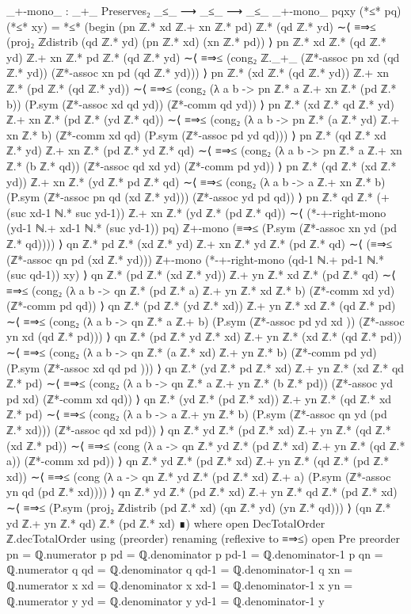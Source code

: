 \documentclass[11pt,a4paper]{article}
\begin{document}
\begin{code}
_+-mono_ :  _+_ Preserves₂ _≤_ ⟶ _≤_ ⟶ _≤_
_+-mono_ {p}{q}{x}{y} (*≤* pq) (*≤* xy) = *≤* (begin
  (pn ℤ.* xd ℤ.+ xn ℤ.* pd) ℤ.* (qd ℤ.* yd)
  ∼⟨ ≡⇒≤ (proj₂ ℤdistrib (qd ℤ.* yd) (pn ℤ.* xd) (xn ℤ.* pd))   ⟩
  pn ℤ.* xd ℤ.* (qd ℤ.* yd) ℤ.+ xn ℤ.* pd ℤ.* (qd ℤ.* yd) 
  ∼⟨ ≡⇒≤ (cong₂ ℤ._+_ (ℤ*-assoc pn xd (qd ℤ.* yd))
    (ℤ*-assoc xn pd (qd ℤ.* yd))) ⟩
  pn ℤ.* (xd ℤ.* (qd ℤ.* yd)) ℤ.+ xn ℤ.* (pd ℤ.* (qd ℤ.* yd)) 
  ∼⟨ ≡⇒≤ (cong₂ (λ a b -> pn ℤ.* a ℤ.+ xn ℤ.* (pd ℤ.* b)) 
    (P.sym (ℤ*-assoc xd qd yd)) (ℤ*-comm qd yd)) ⟩
  pn ℤ.* (xd ℤ.* qd ℤ.* yd) ℤ.+ xn ℤ.* (pd ℤ.* (yd ℤ.* qd)) 
  ∼⟨ ≡⇒≤ (cong₂ (λ a b -> pn ℤ.* (a ℤ.* yd) ℤ.+ xn ℤ.* b) 
    (ℤ*-comm xd qd) (P.sym (ℤ*-assoc pd yd qd))) ⟩
  pn ℤ.* (qd ℤ.* xd ℤ.* yd) ℤ.+ xn ℤ.* (pd ℤ.* yd ℤ.* qd) 
  ∼⟨ ≡⇒≤ (cong₂ (λ a b -> pn ℤ.* a ℤ.+ xn ℤ.* (b ℤ.* qd)) 
    (ℤ*-assoc qd xd yd) (ℤ*-comm pd yd)) ⟩
  pn ℤ.* (qd ℤ.* (xd ℤ.* yd)) ℤ.+ xn ℤ.* (yd ℤ.* pd ℤ.* qd) 
  ∼⟨ ≡⇒≤ (cong₂ (λ a b -> a ℤ.+ xn ℤ.* b) 
    (P.sym (ℤ*-assoc pn qd (xd ℤ.* yd))) (ℤ*-assoc yd pd qd)) ⟩
  pn ℤ.* qd ℤ.* (+ (suc xd-1 ℕ.* suc yd-1)) ℤ.+ xn ℤ.*
    (yd ℤ.* (pd ℤ.* qd))
  ∼⟨ (*-+-right-mono (yd-1 ℕ.+ xd-1 ℕ.* (suc yd-1)) pq)
    ℤ+-mono
    (≡⇒≤ (P.sym (ℤ*-assoc xn yd (pd ℤ.* qd)))) ⟩
  qn ℤ.* pd ℤ.* (xd ℤ.* yd) ℤ.+ xn ℤ.* yd ℤ.* (pd ℤ.* qd) 
  ∼⟨ (≡⇒≤ (ℤ*-assoc qn pd (xd ℤ.* yd))) ℤ+-mono
    (*-+-right-mono (qd-1 ℕ.+ pd-1 ℕ.* (suc qd-1)) xy)  ⟩
  qn ℤ.* (pd ℤ.* (xd ℤ.* yd)) ℤ.+ yn ℤ.* xd ℤ.* (pd ℤ.* qd) 
  ∼⟨ ≡⇒≤ (cong₂ (λ a b -> qn ℤ.* (pd ℤ.* a) ℤ.+ yn ℤ.* xd ℤ.* b) 
    (ℤ*-comm xd yd) (ℤ*-comm pd qd)) ⟩
  qn ℤ.* (pd ℤ.* (yd ℤ.* xd)) ℤ.+ yn ℤ.* xd ℤ.* (qd ℤ.* pd) 
  ∼⟨ ≡⇒≤ (cong₂ (λ a b -> qn ℤ.* a ℤ.+ b) 
    (P.sym (ℤ*-assoc pd yd xd )) (ℤ*-assoc yn xd (qd ℤ.* pd))) ⟩
  qn ℤ.* (pd ℤ.* yd ℤ.* xd) ℤ.+ yn ℤ.* (xd ℤ.* (qd ℤ.* pd)) 
  ∼⟨ ≡⇒≤ (cong₂ (λ a b -> qn ℤ.* (a ℤ.* xd) ℤ.+ yn ℤ.* b) 
    (ℤ*-comm pd yd) (P.sym (ℤ*-assoc xd qd pd ))) ⟩
  qn ℤ.* (yd ℤ.* pd ℤ.* xd) ℤ.+ yn ℤ.* (xd ℤ.* qd ℤ.* pd) 
  ∼⟨ ≡⇒≤ (cong₂ (λ a b -> qn ℤ.* a ℤ.+ yn ℤ.* (b ℤ.* pd)) 
    (ℤ*-assoc yd pd xd) (ℤ*-comm xd qd)) ⟩
  qn ℤ.* (yd ℤ.* (pd ℤ.* xd)) ℤ.+ yn ℤ.* (qd ℤ.* xd ℤ.* pd) 
  ∼⟨ ≡⇒≤ (cong₂ (λ a b -> a ℤ.+ yn ℤ.* b) 
    (P.sym (ℤ*-assoc qn yd (pd ℤ.* xd))) (ℤ*-assoc qd xd pd)) ⟩
  qn ℤ.* yd ℤ.* (pd ℤ.* xd) ℤ.+ yn ℤ.* (qd ℤ.* (xd ℤ.* pd)) 
  ∼⟨ ≡⇒≤ (cong (λ a -> qn ℤ.* yd ℤ.* (pd ℤ.* xd) ℤ.+ yn ℤ.* (qd ℤ.* a)) 
    (ℤ*-comm xd pd)) ⟩
  qn ℤ.* yd ℤ.* (pd ℤ.* xd) ℤ.+ yn ℤ.* (qd ℤ.* (pd ℤ.* xd)) 
  ∼⟨ ≡⇒≤ (cong (λ a -> qn ℤ.* yd ℤ.* (pd ℤ.* xd) ℤ.+ a) 
    (P.sym (ℤ*-assoc yn qd (pd ℤ.* xd)))) ⟩
  qn ℤ.* yd ℤ.* (pd ℤ.* xd) ℤ.+ yn ℤ.* qd ℤ.* (pd ℤ.* xd) 
  ∼⟨ ≡⇒≤ (P.sym (proj₂ ℤdistrib (pd ℤ.* xd) (qn ℤ.* yd) (yn ℤ.* qd))) ⟩
  (qn ℤ.* yd ℤ.+ yn ℤ.* qd) ℤ.* (pd ℤ.* xd)
        ∎)
  where
     open DecTotalOrder ℤ.decTotalOrder using (preorder)
       renaming (reflexive to ≡⇒≤)
     open Pre preorder
     pn = ℚ.numerator p
     pd = ℚ.denominator p
     pd-1 = ℚ.denominator-1 p
     qn = ℚ.numerator q
     qd = ℚ.denominator q
     qd-1 = ℚ.denominator-1 q
     xn = ℚ.numerator x
     xd = ℚ.denominator x
     xd-1 = ℚ.denominator-1 x
     yn = ℚ.numerator y
     yd = ℚ.denominator y
     yd-1 = ℚ.denominator-1 y


\end{code}
\end{document}
